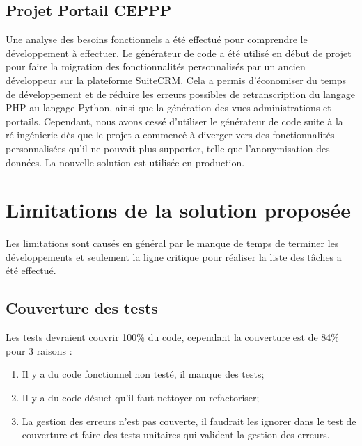 \subsection{Projet Portail CEPPP}

Une analyse des besoins fonctionnels a été effectué pour comprendre le développement à effectuer. Le générateur de code a été utilisé en début de projet pour faire la migration des fonctionnalités personnalisés par un ancien développeur sur la plateforme SuiteCRM. Cela a permis d'économiser du temps de développement et de réduire les erreurs possibles de retranscription du langage PHP au langage Python, ainsi que la génération des vues administrations et portails. Cependant, nous avons cessé d'utiliser le générateur de code suite à la ré-ingénierie dès que le projet a commencé à diverger vers des fonctionnalités personnalisées qu’il ne pouvait plus supporter, telle que l'anonymisation des données. La nouvelle solution est utilisée en production.

\section{Limitations de la solution proposée}\label{sec:Limitations}

Les limitations sont causés en général par le manque de temps de terminer les développements et seulement la ligne critique pour réaliser la liste des tâches a été effectué.

\subsection{Couverture des tests}
Les tests devraient couvrir 100\% du code, cependant la couverture est de 84\% pour 3 raisons :

\begin{enumerate}
    \item Il y a du code fonctionnel non testé, il manque des tests;
    \item Il y a du code désuet qu’il faut nettoyer ou refactoriser;
    \item La gestion des erreurs n’est pas couverte, il faudrait les ignorer dans le test de couverture et faire des tests unitaires qui valident la gestion des erreurs.
\end{enumerate}

